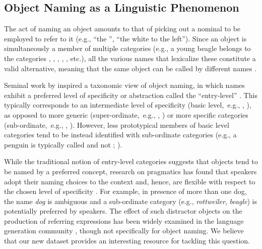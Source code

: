 \subsection{Object Naming as a Linguistic Phenomenon}
\label{subsec:rosch}

The act of naming an object amounts to that of picking out a nominal to be employed to refer to it (e.g., ``the '', ``the white  to the left'').
Since an object is simultaneously a member of multiple categories (e.g., a young beagle belongs to the categories , , , , , etc.), all the various names that lexicalize these constitute a valid alternative, meaning that the same object can be called by different names \cite{brown1958shall,murphy2004big}.

Seminal work by  inspired a taxonomic view of object naming, in which names exhibit a preferred level of specificity or abstraction called the ``entry-level'' \cite{jolicoeur1984pictures}. 
This typically corresponds to an intermediate level of specificity (basic level,\ e.g., , ), as opposed to more generic (super-ordinate,\ e.g., , ) or more specific categories (sub-ordinate,\ e.g., , ).
However, less prototypical members of basic level categories tend to be instead identified with sub-ordinate categories (e.g., a penguin is typically called  and not ; ). 

While the traditional notion of entry-level categories suggests that objects tend to be named by a  preferred concept, research on pragmatics has found that speakers adopt their naming choices to the context and, hence, are flexible with respect to the chosen level of specificity \cite{olson1970language,rohde2012communicating,graf2016animal}.
For example, in presence of more than one dog, the name \textsl{dog} is ambiguous and a sub-ordinate category (e.g., \textsl{rottweiler}, \textsl{beagle}) is potentially preferred by speakers. The effect of such distractor objects on the production of referring expressions has been widely examined in the language generation community \cite{krahmer:2012}, though not specifically for object naming. We believe that our new dataset provides an interesting resource for tackling this question.

